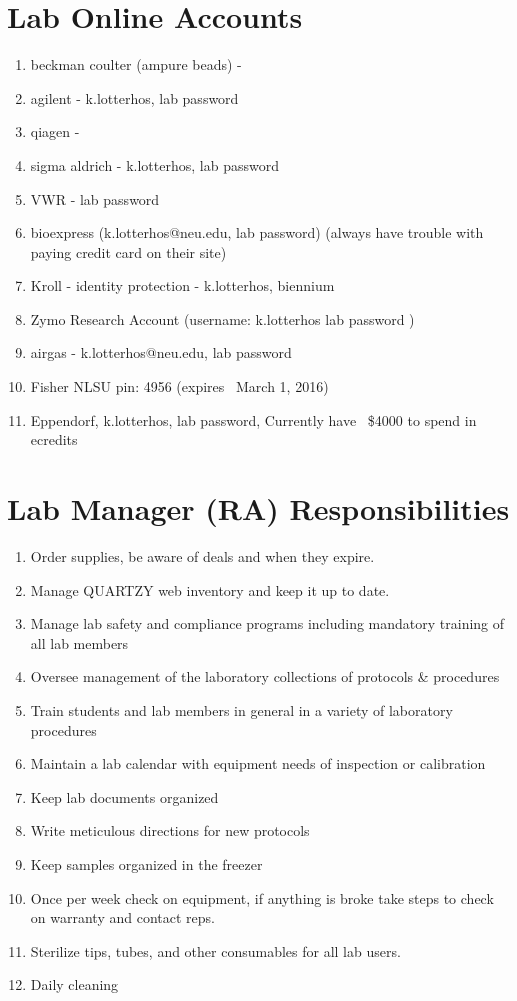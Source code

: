 \documentclass[11pt, oneside]{article}
\begin{document}
\section{Lab Online Accounts}
	\begin{enumerate}
		\item beckman coulter (ampure beads) - 
		\item agilent - k.lotterhos, lab password
		\item qiagen - 
		\item sigma aldrich - k.lotterhos, lab password
		\item VWR - lab password
		\item bioexpress (k.lotterhos@neu.edu, lab password) (always have trouble with paying credit card on their site)
		\item Kroll - identity protection - k.lotterhos, biennium
		\item Zymo Research Account (username: k.lotterhos  lab password
)
		\item airgas - k.lotterhos@neu.edu, lab password
		\item Fisher NLSU pin: 4956 (expires ~March 1, 2016)
		\item Eppendorf, k.lotterhos,  lab password, Currently have ~\$4000 to spend in ecredits
	\end{enumerate}
	\newpage

\section{Lab Manager (RA) Responsibilities}
	\begin{enumerate}
		\item Order supplies, be aware of deals and when they expire.
		\item Manage QUARTZY web inventory and keep it up to date.
		\item Manage lab safety and compliance programs including mandatory training of all lab members
		\item Oversee management of the laboratory collections of protocols \& procedures
		\item Train students and lab members in general in a variety of laboratory procedures
		\item Maintain a lab calendar with equipment needs of inspection or calibration
		\item Keep lab documents organized
		\item Write meticulous directions for new protocols
		\item Keep samples organized in the freezer
		\item Once per week check on equipment, if anything is broke take steps to check on warranty and contact reps.
		\item Sterilize tips, tubes, and other consumables for all lab users. 	
		\item Daily cleaning
	\end{enumerate}
	\newpage
\end{document}
